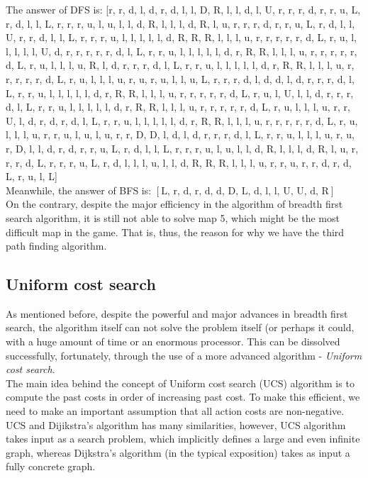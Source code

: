 \documentclass{article}
\begin{document}
The answer of DFS is:
    [r, r, d, l, d, r, d, l, l, D, R, l, l, d, l, U, r, r, r, d, r, r, u, L, r, d, l, l, L, r, r, r, u, l, u, l, l, d, R, l, l, l, d, R, l, u, r, r, r, d, r, r, u, L, r, d, l, l, U, r, r, d, l, l, L, r, r, r, u, l, l, l, l, l, d, R, R, R, l, l, l, u, r, r, r, r, r, d, L, r, u, l, l, l, l, l, U, d, r, r, r, r, r, d, l, L, r, r, u, l, l, l, l, l, d, r, R, R, l, l, l, u, r, r, r, r, r, d, L, r, u, l, l, l, u, R, l, d, r, r, r, d, l, L, r, r, u, l, l, l, l, l, d, r, R, R, l, l, l, u, r, r, r, r, r, d, L, r, u, l, l, l, u, r, u, r, u, l, l, u, L, r, r, r, d, l, d, d, l, d, r, r, r, d, l, L, r, r, u, l, l, l, l, l, d, r, R, R, l, l, l, u, r, r, r, r, r, d, L, r, u, l, U, l, l, d, r, r, r, d, l, L, r, r, u, l, l, l, l, l, d, r, R, R, l, l, l, u, r, r, r, r, r, d, L, r, u, l, l, l, u, r, r, U, l, d, r, d, r, d, l, L, r, r, u, l, l, l, l, l, d, r, R, R, l, l, l, u, r, r, r, r, r, d, L, r, u, l, l, l, u, r, r, u, l, u, l, u, r, r, D, D, l, d, l, d, r, r, r, d, l, L, r, r, u, l, l, l, u, r, u, r, D, l, l, d, r, d, r, r, u, L, r, d, l, l, L, r, r, r, u, l, u, l, l, d, R, l, l, l, d, R, l, u, r, r, r, d, L, r, r, r, u, L, r, d, l, l, l, u, l, l, d, R, R, R, l, l, l, u, r, r, u, r, r, d, r, d, L, r, u, l, L]\\
    
Meanwhile, the answer of BFS is: $\left[\text{L, r, d, r, d, d, D, L, d, l, l, U, U, d, R}\right]$\\

On the contrary, despite the major efficiency in the algorithm of breadth first search algorithm, it is still not able to solve map 5, which might be the most difficult map in the game. That is, thus, the reason for why we have the third path finding algorithm.
\subsection{Uniform cost search}
As mentioned before, despite the powerful and major advances in breadth first search, the algorithm itself can not solve the problem itself (or perhaps it could, with a huge amount of time or an enormous processor. This can be dissolved successfully, fortunately, through the use of a more advanced algorithm - \textit{Uniform cost search}.\\

The main idea behind the concept of Uniform cost search (UCS) algorithm is to compute the past costs in order of increasing past cost. To make this efficient, we need to make an important assumption that all action costs are non-negative. UCS and Dijikstra's algorithm has many similarities, however, UCS algorithm takes input as a search problem, which implicitly defines a large and even infinite graph, whereas Dijkstra’s algorithm (in the typical exposition) takes as input a fully concrete graph.\\ 
\end{document}
